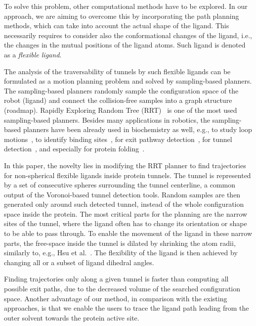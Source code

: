 \documentclass{bmcart}
\begin{document}
To solve this problem, other computational methods have to be explored.
In our approach, we are aiming to overcome this by incorporating the path planning methods, which can take into account the actual shape of the ligand.
This necessarily requires to consider also the conformational changes of the ligand, i.e., the changes in the mutual positions of the ligand atoms.
Such ligand is denoted as a \textit{flexible ligand}.

The analysis of the traversability of tunnels by such flexible ligands can be formulated as a motion planning problem and solved by sampling-based planners.
The sampling-based planners randomly sample the configuration space of the robot (ligand) and connect the collision-free samples into a graph structure (roadmap).
Rapidly Exploring Random Tree (RRT)~\cite{lavalleRRT} is one of the most used sampling-based planners. 
Besides many applications in robotics, the sampling-based planners have been already used in biochemistry as well, e.g., to study loop motions~\cite{cortes2004geometric}, to identify binding sites~\cite{bayazit2001ligand}, for exit pathway detection~\cite{cortes2010simulating,cortes2005path}, for tunnel detection~\cite{vonasek2017tunnel}, and especially for protein folding~\cite{raveh2009rapid,amato2002using}. %

In this paper, the novelty lies in modifying the RRT planner to find trajectories for non-spherical flexible ligands inside protein tunnels.
The tunnel is represented by a set of consecutive spheres surrounding the tunnel centerline, a common output of the Voronoi-based tunnel detection tools.
Random samples are then generated only around such detected tunnel, instead of the whole configuration space inside the protein.
The most critical parts for the planning are the narrow sites of the tunnel, where the ligand often has to change its orientation or shape to be able to pass through.
To enable the movement of the ligand in these narrow parts, the free-space inside the tunnel is dilated by shrinking the atom radii, similarly to, e.g., Hsu et al.~\cite{hsu06multilevel}.  %
The flexibility of the ligand is then achieved by changing all or a subset of ligand dihedral angles.

Finding trajectories only along a given tunnel is faster than computing all possible exit paths, due to the decreased volume of the searched configuration space.
Another advantage of our method, in comparison with the existing approaches, is that we enable the users to trace the ligand path leading from the outer solvent towards the protein active site.
\end{document}
